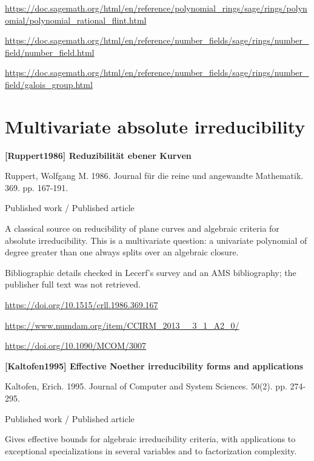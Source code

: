 \documentclass[11pt,a4paper,oneside,openany]{book}
\begin{document}
{\footnotesize\url{https://doc.sagemath.org/html/en/reference/polynomial_rings/sage/rings/polynomial/polynomial_rational_flint.html}}\par
{\footnotesize\url{https://doc.sagemath.org/html/en/reference/number_fields/sage/rings/number_field/number_field.html}}\par
{\footnotesize\url{https://doc.sagemath.org/html/en/reference/number_fields/sage/rings/number_field/galois_group.html}}\par
\vspace{9pt}
\section{Multivariate absolute irreducibility}
\hypertarget{ref:Ruppert1986}{}
{\sffamily\bfseries\color{atlasgreen}[Ruppert1986] Reduzibilität ebener Kurven}\par
\color{black} Ruppert, Wolfgang M. 1986. Journal für die reine und angewandte Mathematik. 369. pp. 167-191.\par
{\small\sffamily\color{atlasgold}Published work / Published article}\par
\color{black} A classical source on reducibility of plane curves and algebraic criteria for absolute irreducibility. This is a multivariate question: a univariate polynomial of degree greater than one always splits over an algebraic closure.\par
{\small Bibliographic details checked in Lecerf's survey and an AMS bibliography; the publisher full text was not retrieved.}\par
{\footnotesize\url{https://doi.org/10.1515/crll.1986.369.167}}\par
{\footnotesize\url{https://www.numdam.org/item/CCIRM_2013__3_1_A2_0/}}\par
{\footnotesize\url{https://doi.org/10.1090/MCOM/3007}}\par
\vspace{9pt}
\hypertarget{ref:Kaltofen1995}{}
{\sffamily\bfseries\color{atlasgreen}[Kaltofen1995] Effective Noether irreducibility forms and applications}\par
\color{black} Kaltofen, Erich. 1995. Journal of Computer and System Sciences. 50(2). pp. 274-295.\par
{\small\sffamily\color{atlasgold}Published work / Published article}\par
\color{black} Gives effective bounds for algebraic irreducibility criteria, with applications to exceptional specializations in several variables and to factorization complexity.\par
\end{document}
